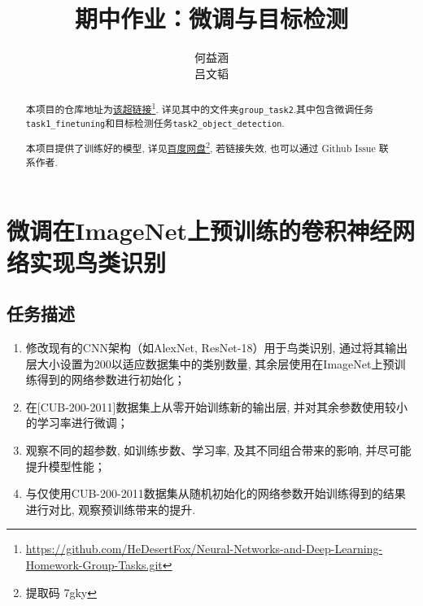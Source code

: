 \documentclass[notitlepage,cs4size,punct,oneside]{ctexrep}
\title{{\zihao{1}\bfseries 期中作业：微调与目标检测}}
\author{何益涵 \quad 20307110032\\吕文韬 \quad 23210180109}
\date{}
\numberwithin{equation}{chapter}
\theoremstyle{mystyle}
\begin{document}
\CTEXoptions[abstractname={摘要: }]
\CTEXoptions[bibname={\bfseries 参考文献}]

\renewcommand{\thepage}{\roman{page}}
\setcounter{page}{1}

\maketitle\renewcommand{\thepage}{\arabic{page}}
\thispagestyle{empty}\setcounter{page}{0}
\renewcommand{\abstractname}{摘要: }
\begin{abstract}
     本项目的仓库地址为\href{https://github.com/HeDesertFox/Neural-Networks-and-Deep-Learning-Homework-Group-Tasks.git}{该超链接}\footnote{\href{https://github.com/HeDesertFox/Neural-Networks-and-Deep-Learning-Homework-Group-Tasks.git}{https://github.com/HeDesertFox/Neural-Networks-and-Deep-Learning-Homework-Group-Tasks.git}}. 详见其中的文件夹\texttt{group\_task2}.其中包含微调任务\texttt{task1\_finetuning}和目标检测任务\texttt{task2\_object\_detection}.

     本项目提供了训练好的模型, 详见\href{https://pan.baidu.com/s/13tcZIUmMMGd9pm_A8NpbZQ?pwd=7gky}{百度网盘}\footnote{提取码 7gky}, 若链接失效, 也可以通过 Github Issue 联系作者.


\end{abstract}



\chapter{微调在ImageNet上预训练的卷积神经网络实现鸟类识别}
\section{任务描述}
\begin{enumerate}
\item 修改现有的CNN架构（如AlexNet, ResNet-18）用于鸟类识别, 通过将其输出层大小设置为200以适应数据集中的类别数量, 其余层使用在ImageNet上预训练得到的网络参数进行初始化；
\item 在[CUB-200-2011]数据集上从零开始训练新的输出层, 并对其余参数使用较小的学习率进行微调；
\item 观察不同的超参数, 如训练步数、学习率, 及其不同组合带来的影响, 并尽可能提升模型性能；
\item 与仅使用CUB-200-2011数据集从随机初始化的网络参数开始训练得到的结果进行对比, 观察预训练带来的提升.
\end{enumerate}
\end{document}
